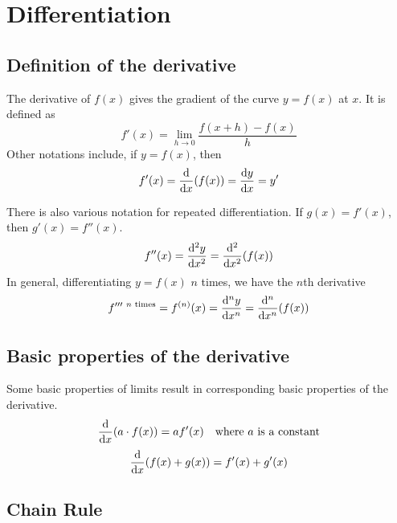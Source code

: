 \section{Differentiation}


\subsection{Definition of the derivative}

The derivative of \(f(x)\) gives the gradient of the curve \(y = f(x)\) at
\(x\). It is defined as
\begin{equation}
f'(x) = \lim_{h \to 0} \frac{f(x + h) - f(x)}{h}
\end{equation}
Other notations include, if \(y = f(x)\), then
\begin{equation}
f'(x) = \dv{x}(f(x)) = \dv{y}{x} = y'
\end{equation}

There is also various notation for repeated differentiation. If
\(g(x) = f'(x)\), then \(g'(x) = f''(x)\).
\begin{equation*}
f''(x) = \dv[2]{y}{x} = \dv[2]{x}(f(x))
\end{equation*}
In general, differentiating \(y = f(x)\) \(n\) times, we have the \(n\)th
derivative
\begin{equation*}
f'''^{\ \text{\(n\) times}} = f^{(n)}(x) = \dv[n]{y}{x} = \dv[n]{x}(f(x))
\end{equation*}

\subsection{Basic properties of the derivative}
\label{sec_calc_derivative_properties}

Some basic properties of limits result in corresponding basic properties of
the derivative.
\begin{equation*}
\dv{x}(a \cdot f(x)) = af'(x) \quad \text{where \(a\) is a constant}
\end{equation*}
\begin{equation*}
\dv{x}(f(x) + g(x)) = f'(x) + g'(x)
\end{equation*}

\subsection{Chain Rule} \label{sec_calc_chain}

